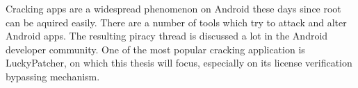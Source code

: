 Cracking apps are a widespread phenomenon on Android these days since root can be aquired easily.
There are a number of tools which try to attack and alter Android apps.
The resulting piracy thread is discussed a lot in the Android developer community.
One of the most popular cracking application is LuckyPatcher, on which this thesis will focus, especially on its license verification bypassing mechanism.
